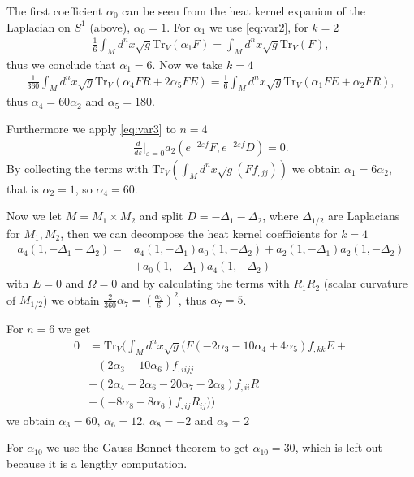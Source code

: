\documentclass[a4paper]{article}
\theoremstyle{definition}
\theoremstyle{definition}
\theoremstyle{definition}
\theoremstyle{theorem}
\theoremstyle{theorem}
\theoremstyle{theorem}
\begin{document}
The first coefficient $\alpha_0$ can be seen from the heat kernel expanion of
the Laplacian on $S^1$ (above), $\alpha_0 = 1$. For $\alpha_1$ we use
\ref{eq:var2}, for $k = 2$
\begin{align}
    \frac{1}{6} \int_M d^n x\sqrt{g} \text{Tr}_V(\alpha_1F) = \int_M d^n
    x\sqrt{g} \text{Tr}_V(F),
\end{align}
thus we conclude that $\alpha_1 = 6$. Now we take $k=4$
\begin{align}
    \frac{1}{360}\int_Md^n x \sqrt{g}\text{Tr}_V(\alpha_4 F R + 2\alpha_5 F E)
    = \frac{1}{6} \int_Md^n x\sqrt{g}\text{Tr}_V(\alpha_1 FE + \alpha_2 FR),
\end{align}
thus $\alpha_4 = 60\alpha_2$ and $\alpha_5 = 180$.

Furthermore we apply \ref{eq:var3} to $n=4$
\begin{align}
    \frac{d}{d\varepsilon}|_{\varepsilon=0} a_2(e^{-2\varepsilon f}F,
    e^{-2\varepsilon f}D) = 0.
\end{align}
By collecting the terms with $\text{Tr}_V(\int_Md^nx\sqrt{g}(Ff_{,jj}))$ we
obtain $\alpha_1 = 6\alpha_2$, that is $\alpha_2 = 1$, so $\alpha_4 = 60$.

Now we let $M=M_1\times M_2$ and split $D = -\Delta_1 -\Delta_2$, where
$\Delta_{1/2}$ are Laplacians for $M_1, M_2$, then we can decompose the heat
kernel coefficients for $k=4$
\begin{align}
    a_4(1,-\Delta_1-\Delta_2) =& a_4(1, -\Delta_1) a_0(1, -\Delta_2)
    +a_2(1,-\Delta_1) a_2(1,-\Delta_2) \\&+ a_0(1,-\Delta_1) a_4(1,-\Delta_2)
\end{align}
with $E=0$ and $\Omega =0$ and by calculating the terms with $R_1R_2$  (scalar
curvature of $M_{1/2}$) we obtain $\frac{2}{360}\alpha_7 =
(\frac{\alpha_2}{6})^2$, thus $\alpha_7 = 5$.

For $n=6$ we get
\begin{align}
    0 &= \text{Tr}_V(\int_Md^nx\sqrt{g}
    (F(-2\alpha_3-10\alpha_4+4\alpha_5)f_{,kk}E +\\
    &+(2\alpha_3 + 10\alpha_6)f_{,iijj}+\\
    &+(2\alpha_4 -2\alpha_6 - 20\alpha_7 -2\alpha_8)f_{,ii}R\\
    &+(-8\alpha_8 -8\alpha_6)f_{,ij}R_{ij}))
\end{align}
we obtain $\alpha_3 = 60$, $\alpha_6=12$, $\alpha_8 = -2$ and $\alpha_9 = 2$

For $\alpha_{10}$ we use the Gauss-Bonnet theorem to get $\alpha_{10}=30$,
which is left out because it is a lengthy computation.
\end{document}
